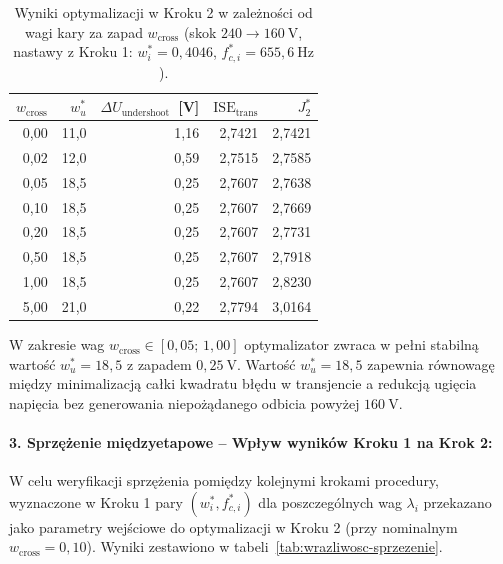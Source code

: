 \begin{table}[h!]
    \centering
    \caption{Wyniki optymalizacji w Kroku 2 w zależności od wagi kary za zapad $w_{\mathrm{cross}}$ (skok $240 \to 160~\mathrm{V}$, nastawy z Kroku 1: $w_i^* = 0{,}4046$, $f_{c,i}^* = 655{,}6~\mathrm{Hz}$).}
    \label{tab:wrazliwosc-krok2}
    \begin{tabular}{rrrrr}
        \toprule
        $w_{\mathrm{cross}}$ & $w_u^*$ & $\Delta U_{\mathrm{undershoot}}$~[V] & $\mathrm{ISE}_{\mathrm{trans}}$ & $J_2^*$ \\
        \midrule
        0{,}00 & 11{,}0 & 1{,}16 & 2{,}7421 & 2{,}7421 \\
        0{,}02 & 12{,}0 & 0{,}59 & 2{,}7515 & 2{,}7585 \\
        0{,}05 & 18{,}5 & 0{,}25 & 2{,}7607 & 2{,}7638 \\
        0{,}10 & 18{,}5 & 0{,}25 & 2{,}7607 & 2{,}7669 \\
        0{,}20 & 18{,}5 & 0{,}25 & 2{,}7607 & 2{,}7731 \\
        0{,}50 & 18{,}5 & 0{,}25 & 2{,}7607 & 2{,}7918 \\
        1{,}00 & 18{,}5 & 0{,}25 & 2{,}7607 & 2{,}8230 \\
        5{,}00 & 21{,}0 & 0{,}22 & 2{,}7794 & 3{,}0164 \\
        \bottomrule
    \end{tabular}
\end{table}

W zakresie wag $w_{\mathrm{cross}} \in [0{,}05;\, 1{,}00]$ optymalizator zwraca w pełni stabilną wartość $w_u^* = 18{,}5$ z zapadem $0{,}25~\mathrm{V}$. Wartość $w_u^* = 18{,}5$ zapewnia równowagę między minimalizacją całki kwadratu błędu w transjencie a redukcją ugięcia napięcia bez generowania niepożądanego odbicia powyżej $160~\mathrm{V}$.

\paragraph{3. Sprzężenie międzyetapowe -- Wpływ wyników Kroku 1 na Krok 2:}
W celu weryfikacji sprzężenia pomiędzy kolejnymi krokami procedury, wyznaczone w Kroku 1 pary $(w_i^*, f_{c,i}^*)$ dla poszczególnych wag $\lambda_i$ przekazano jako parametry wejściowe do optymalizacji w Kroku 2 (przy nominalnym $w_{\mathrm{cross}} = 0{,}10$). Wyniki zestawiono w tabeli~\ref{tab:wrazliwosc-sprzezenie}.

